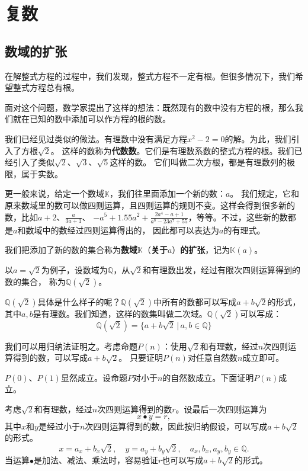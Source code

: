 \documentclass[12pt,UTF8]{ctexbook}
\begin{document}
\chapter{复数}

\section{数域的扩张}

在解整式方程的过程中，我们发现，整式方程不一定有根。但很多情况下，我们希望整式方程总有根。

面对这个问题，数学家提出了这样的想法：既然现有的数中没有方程的根，那么我们就在已知的数中添加可以作方程的根的数。

我们已经见过类似的做法。有理数中没有满足方程$x^2 - 2 = 0$的解。为此，我们引入了方根$\sqrt{2}$。
这样的数称为\textbf{代数数}。它们是有理数系数的整式方程的根。我们已经引入了类似$\sqrt{2}$、$\sqrt{3}$、$\sqrt{5}$这样的数。
它们叫做二次方根，都是有理数列的极限，属于实数。

更一般来说，给定一个数域$\mathbb{K}$，我们往里面添加一个新的数：$a$。
我们规定，它和原来数域里的数可以做四则运算，且四则运算的规则不变。这样会得到很多新的数，比如$a+2$、$\frac{a}{3a+1}$、
$- a^5 + 1.55a^2 + \frac{2a^4 - a + 1}{a^8 - 23a^7 + 55}$，等等。不过，这些新的数都是$a$和数域中的数经过四则运算得出的，
因此都可以表达为$a$的有理式。

我们把添加了新的数的集合称为\textbf{数域}$\mathbb{K}$（\textbf{关于}$a$）\textbf{的扩张}，记为$\mathbb{K}(a)$。

以$a = \sqrt{2}$为例子，设数域为$\mathbb{Q}$，从$\sqrt{2}$和有理数出发，经过有限次四则运算得到的数的集合，
称为$\mathbb{Q}(\sqrt{2})$。

$\mathbb{Q}(\sqrt{2})$具体是什么样子的呢？$\mathbb{Q}(\sqrt{2})$中所有的数都可以写成$a + b\sqrt{2}$的形式，
其中$a,b$是有理数。我们知道，这样的数集叫做二次域。$\mathbb{Q}(\sqrt{2})$可以写成：
$$ \mathbb{Q}(\sqrt{2}) = \{a + b\sqrt{2} \, | \, a, b \in\mathbb{Q}\}$$

我们可以用归纳法证明之。考虑命题$P(n)$：使用$\sqrt{2}$和有理数，经过$n$次四则运算得到的数，可以写成$a + b\sqrt{2}$。
只要证明$P(n)$对任意自然数$n$成立即可。

$P(0)$、$P(1)$显然成立。设命题$P$对小于$n$的自然数成立。下面证明$P(n)$成立。

考虑$\sqrt{2}$和有理数，经过$n$次四则运算得到的数$r$。设最后一次四则运算为
$$ x \bullet y = r,$$
其中$x$和$y$是经过小于$n$次四则运算得到的数，因此按归纳假设，可以写成$a + b\sqrt{2}$的形式。
$$ x = a_x + b_x\sqrt{2}, \quad y = a_y + b_y\sqrt{2}, \quad a_x, b_x, a_y, b_y \in \mathbb{Q}.$$
当运算$\bullet$是加法、减法、乘法时，容易验证$r$也可以写成$a + b\sqrt{2}$的形式。
\end{document}
